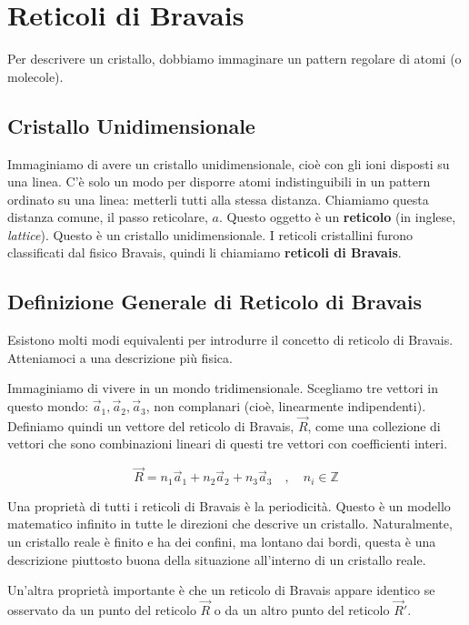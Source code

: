 \section*{Reticoli di Bravais}

Per descrivere un cristallo, dobbiamo immaginare un pattern regolare di atomi (o molecole).

\subsection{Cristallo Unidimensionale}

Immaginiamo di avere un cristallo unidimensionale, cioè con gli ioni disposti su una linea. C'è solo un modo per disporre atomi indistinguibili in un pattern ordinato su una linea: metterli tutti alla stessa distanza. Chiamiamo questa distanza comune, il passo reticolare, $a$. Questo oggetto è un \textbf{reticolo} (in inglese, \textit{lattice}). Questo è un cristallo unidimensionale. I reticoli cristallini furono classificati dal fisico Bravais, quindi li chiamiamo \textbf{reticoli di Bravais}.

\subsection{Definizione Generale di Reticolo di Bravais}

Esistono molti modi equivalenti per introdurre il concetto di reticolo di Bravais. Atteniamoci a una descrizione più fisica.

Immaginiamo di vivere in un mondo tridimensionale. Scegliamo tre vettori in questo mondo: $\vec{a}_1, \vec{a}_2, \vec{a}_3$, non complanari (cioè, linearmente indipendenti). Definiamo quindi un vettore del reticolo di Bravais, $\vec{R}$, come una collezione di vettori che sono combinazioni lineari di questi tre vettori con coefficienti interi.

\begin{equation}
 \vec{R} = n_1 \vec{a}_1 + n_2 \vec{a}_2 + n_3 \vec{a}_3 \quad , \quad n_i \in \mathbb{Z}
\end{equation}

Una proprietà di tutti i reticoli di Bravais è la periodicità. Questo è un modello matematico infinito in tutte le direzioni che descrive un cristallo. Naturalmente, un cristallo reale è finito e ha dei confini, ma lontano dai bordi, questa è una descrizione piuttosto buona della situazione all'interno di un cristallo reale.

Un'altra proprietà importante è che un reticolo di Bravais appare identico se osservato da un punto del reticolo $\vec{R}$ o da un altro punto del reticolo $\vec{R}'$.

